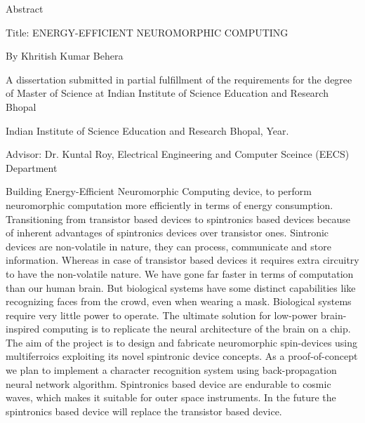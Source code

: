 \vspace*{0.5mm}
\begin{center}
\large{Abstract}
\end{center}

\vspace*{1cm}
\begin{flushleft}
Title: ENERGY-EFFICIENT NEUROMORPHIC COMPUTING
\end{flushleft}

\begin{flushleft}
By Khritish Kumar Behera
\end{flushleft}

\begin{flushleft}
A dissertation submitted in partial fulfillment of the requirements for the degree of Master of Science at Indian Institute of Science Education and Research Bhopal 
\end{flushleft}

\begin{center}
Indian Institute of Science Education and Research Bhopal, Year.
\end{center}

\begin{center}
Advisor: Dr. Kuntal Roy, Electrical Engineering and Computer Sceince (EECS) Department
\end{center}

\vspace*{1cm}
\doublespacing
Building Energy-Efficient Neuromorphic Computing device, to perform neuromorphic computation more efficiently in terms of energy consumption. Transitioning from transistor based devices to spintronics based devices because of inherent advantages of spintronics devices over transistor ones. Sintronic devices are non-volatile in nature, they can process, communicate and store information. Whereas in case of transistor based devices it requires extra circuitry to have the non-volatile nature.
We have gone far faster in terms of computation than our human brain. But biological systems have some distinct capabilities like recognizing faces from the crowd, even when wearing a mask. Biological systems require very little power to operate. The ultimate solution for low-power brain-inspired computing is to replicate the neural architecture of the brain on a chip. The aim of the project is to design and fabricate neuromorphic spin-devices using multiferroics exploiting its novel spintronic device concepts. As a proof-of-concept we plan to implement a character recognition system using back-propagation neural network algorithm.
Spintronics based device are endurable to cosmic waves, which makes it suitable for outer space instruments. In the future the spintronics based device will replace the transistor based device.
